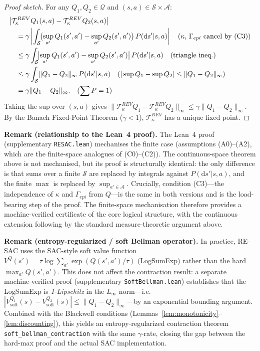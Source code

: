 \begin{proof}[Proof sketch]
For any $Q_1,Q_2\in\mathcal{Q}$ and $(s,a)\in\mathcal{S}\times\mathcal{A}$:
\begin{align}
    &\bigl|\mathcal{T}^{REV}_\kappa Q_1(s,a) - \mathcal{T}^{REV}_\kappa Q_2(s,a)\bigr| \notag\\
    &\quad = \gamma\left|\int_\mathcal{S}\!\bigl(\sup_{a'}Q_1(s',a')-\sup_{a'}Q_2(s',a')\bigr)\,P(\mathrm{d}s'|s,a)\right|
    \quad\text{($\kappa$, $\Gamma_{epi}$ cancel by (C3))} \notag\\
    &\quad \le \gamma\int_\mathcal{S}\!\bigl|\sup_{a'}Q_1(s',a')-\sup_{a'}Q_2(s',a')\bigr|\,P(\mathrm{d}s'|s,a)
    \quad\text{(triangle ineq.)} \notag\\
    &\quad \le \gamma\int_\mathcal{S}\!\|Q_1-Q_2\|_\infty\,P(\mathrm{d}s'|s,a)
    \quad\text{($|\sup Q_1 - \sup Q_2|\le\|Q_1-Q_2\|_\infty$)} \notag\\
    &\quad = \gamma\|Q_1-Q_2\|_\infty.
    \quad\text{($\sum P = 1$)} \notag
\end{align}
Taking the sup over $(s,a)$ gives $\|\mathcal{T}^{REV}_\kappa Q_1 - \mathcal{T}^{REV}_\kappa Q_2\|_\infty\le\gamma\|Q_1-Q_2\|_\infty$.
By the Banach Fixed-Point Theorem ($\gamma<1$), $\mathcal{T}^{REV}_\kappa$ has a unique fixed point.
\end{proof}


\textbf{Remark (relationship to the Lean~4 proof).}
The Lean~4 proof (supplementary \texttt{RESAC.lean}) mechanises the finite case
(assumptions (A0)--(A2), which are the finite-space analogues of (C0)--(C2)).
The continuous-space theorem above is not mechanised, but its proof is
structurally identical: the only difference is that sums over a finite $\mathcal{S}$
are replaced by integrals against $P(\mathrm{d}s'|s,a)$, and the finite $\max$ is
replaced by $\sup_{a'\in\mathcal{A}}$.  Crucially, condition (C3)---the
independence of $\kappa$ and $\Gamma_{epi}$ from $Q$---is the same in both
versions and is the load-bearing step of the proof.  The finite-space
mechanisation therefore provides a machine-verified certificate of the core
logical structure, with the continuous extension following by the standard
measure-theoretic argument above.

\textbf{Remark (entropy-regularized / soft Bellman operator).}
In practice, RE-SAC uses the SAC-style soft value function
$V^Q(s')=\tau\log\sum_{a'}\exp(Q(s',a')/\tau)$ (LogSumExp) rather than the hard
$\max_{a'}Q(s',a')$.  This does not affect the contraction result: a separate
machine-verified proof (supplementary \texttt{SoftBellman.lean}) establishes
that the LogSumExp is \emph{1-Lipschitz} in the $L_\infty$ norm---i.e.\
$|V^{Q_1}_{\mathrm{soft}}(s) - V^{Q_2}_{\mathrm{soft}}(s)|\le\|Q_1-Q_2\|_\infty$---by
an exponential bounding argument.  Combined with the Blackwell conditions
(Lemmas~\ref{lem:monotonicity}--\ref{lem:discounting}), this yields an
entropy-regularized contraction theorem \texttt{soft\_bellman\_contraction} with
the same $\gamma$-rate, closing the gap between the hard-max proof and the
actual SAC implementation.


